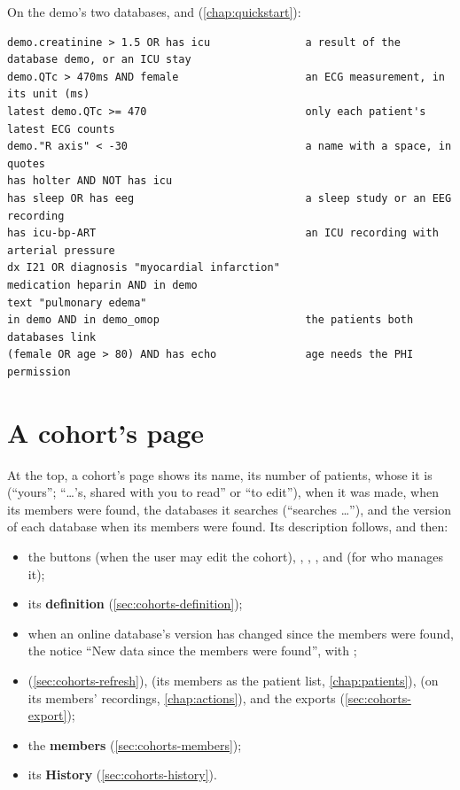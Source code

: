 On the demo's two databases,  and  (\cref{chap:quickstart}):
\begin{lstlisting}[style=text]
demo.creatinine > 1.5 OR has icu               a result of the database demo, or an ICU stay
demo.QTc > 470ms AND female                    an ECG measurement, in its unit (ms)
latest demo.QTc >= 470                         only each patient's latest ECG counts
demo."R axis" < -30                            a name with a space, in quotes
has holter AND NOT has icu
has sleep OR has eeg                           a sleep study or an EEG recording
has icu-bp-ART                                 an ICU recording with arterial pressure
dx I21 OR diagnosis "myocardial infarction"
medication heparin AND in demo
text "pulmonary edema"
in demo AND in demo_omop                       the patients both databases link
(female OR age > 80) AND has echo              age needs the PHI permission
\end{lstlisting}

\section{A cohort's page}
\label{sec:cohorts-page}

At the top, a cohort's page shows its name, its number of patients, whose it is (``yours'';
``\dots's, shared with you to read'' or ``to edit''), when it was made, when its members were
found, the databases it searches (``searches \dots''), and the version of each database when its
members were found. Its description follows, and then:
\begin{itemize}
\item the buttons  (when the user may edit the cohort), ,
  , ,  and  (for who manages
  it);
\item its \textbf{definition} (\cref{sec:cohorts-definition});
\item when an online database's version has changed since the members were found, the notice
  ``New data since the members were found'', with ;
\item {} (\cref{sec:cohorts-refresh}), 
  (its members as the patient list, \cref{chap:patients}),  (on its
  members' recordings, \cref{chap:actions}), and the exports
  (\cref{sec:cohorts-export});
\item the \textbf{members} (\cref{sec:cohorts-members});
\item its \textbf{History} (\cref{sec:cohorts-history}).
\end{itemize}

